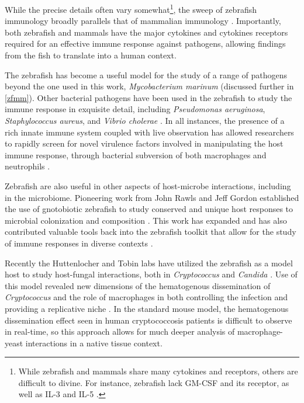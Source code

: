 While the precise details often vary somewhat\footnote{While zebrafish and mammals share many cytokines and receptors, others are difficult to divine. For instance, zebrafish lack GM-CSF and its receptor, as well as IL-3 and IL-5 \citep{Pazhakh2018}.}, the sweep of zebrafish immunology broadly parallels that of mammalian immunology \citep{Zou2016}. Importantly, both zebrafish and mammals have the major cytokines and cytokines receptors required for an effective immune response against pathogens, allowing findings from the fish to translate into a human context. 

The zebrafish has become a useful model for the study of a range of pathogens beyond the one used in this work, \textit{Mycobacterium marinum} \citep{Benard2012, Brannon2009, Briolat2014} (discussed further in \autoref{zfmm}). Other bacterial pathogens have been used in the zebrafish to study the immune response in exquisite detail, including \textit{Pseudomonas aeruginosa}, \textit{Staphylococcus aureus}, and \textit{Vibrio cholerae} \citep{Runft2014}. In all instances, the presence of a rich innate immune system coupled with live observation has allowed researchers to rapidly screen for novel virulence factors involved in manipulating the host immune response, through bacterial subversion of both macrophages and neutrophils \citep{Torraca2018}.  

Zebrafish are also useful in other aspects of host-microbe interactions, including in the microbiome. Pioneering work from John Rawls and Jeff Gordon established the use of gnotobiotic zebrafish to study conserved and unique host responses to microbial colonization and composition \citep{Rawls2004, Rawls2006}. This work has expanded and has also contributed valuable tools back into the zebrafish toolkit that allow for the study of immune responses in diverse contexts \citep{Kanther2011}.

\citep{Gratacap2014}

Recently the Huttenlocher and Tobin labs have utilized the zebrafish as a model host to study host-fungal interactions, both in \textit{Cryptococcus} and \textit{Candida} \citep{Johnson2018}. Use of this model revealed new dimensions of the hematogenous dissemination of \textit{Cryptococcus} and the role of macrophages in both controlling the infection and providing a replicative niche \citep{Tenor2015, Davis2016}. In the standard mouse model, the hematogenous dissemination effect seen in human cryptococcosis patients is difficult to observe in real-time, so this approach allows for much deeper analysis of macrophage-yeast interactions in a native tissue context. 

